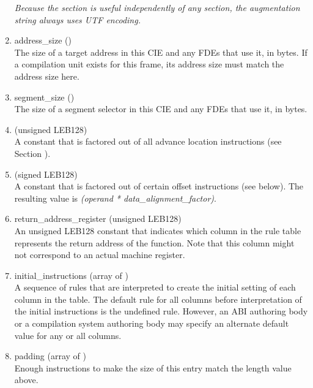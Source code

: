 \begin{enumerate}[1. ]
\textit{Because the  section is useful independently of
any  section, the augmentation string always uses
UTF encoding.}

\item  address\_size () \\
The size of a target address
in this CIE and any FDEs that
use it, in bytes. If a compilation unit exists for this frame,
its address size must match the address size here.

\item  segment\_size () \\
The 
size of a segment selector in this CIE and any FDEs that
use it, in bytes.

\item  {} (unsigned LEB128) 
 \\
A 
constant that is factored out of all advance location
instructions (see 
Section ).


\item  {} (signed LEB128)
 \\
A 
constant that is factored out of certain offset instructions
(see below). The resulting value is  \textit{(operand *
data\_alignment\_factor)}.

\item  return\_address\_register (unsigned LEB128) \\
An unsigned LEB128 constant that indicates which column in the
rule table represents the return address of the function. Note
that this column might not correspond to an actual machine
register.

\item initial\_instructions (array of ) \\
A sequence of rules that are interpreted to create the initial
setting of each column in the table.  The default rule for
all columns before interpretation of the initial instructions
is the undefined rule. However, an ABI authoring body or a
compilation system authoring body may specify an alternate
default value for any or all columns.

\item padding (array of ) \\
Enough  instructions to make the size of this entry
match the length value above.
\end{enumerate}

